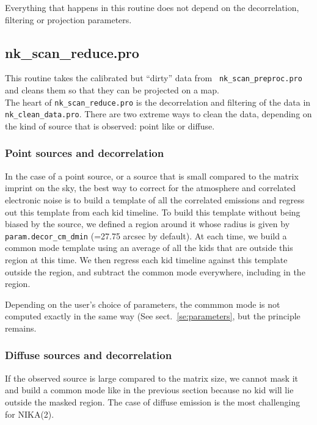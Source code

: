 \documentclass[a4paper,10pt]{article}
\begin{document}
Everything that happens in this routine does not depend on the decorrelation,
filtering or projection parameters.


\subsection{nk\_scan\_reduce.pro}

This routine takes the calibrated but ``dirty'' data from {\tt
  nk\_scan\_preproc.pro} and cleans them so that they can be projected on a
map.\\

The heart of {\tt nk\_scan\_reduce.pro} is the decorrelation and filtering of
the data in {\tt nk\_clean\_data.pro}. There are two extreme ways to clean the
data, depending on the kind of source  that is observed: point like or diffuse.

\subsubsection{Point sources and decorrelation}

In the case of a point source, or a source that is small compared to the matrix
imprint on the sky, the best way to correct for the atmosphere and correlated
electronic noise is to build a template of all the correlated emissions and
regress out this template from each kid timeline. To build this template without
being biased by the source, we defined a region around it whose radius is given
by {\tt param.decor\_cm\_dmin} (=27.75 arcsec by default). At each time, we
build a common mode template using an average of all the kids that are outside
this region at this time. We then regress each kid timeline against this
template outside the region, and subtract the common mode everywhere, including
in the region.

Depending on the user's choice of parameters, the commmon mode is not computed
exactly in the same way (See sect.~\ref{se:parameters}, but the principle remains.

\subsubsection{Diffuse sources and decorrelation}

If the observed source is large compared to the matrix size, we cannot mask it
and build a common mode like in the previous section because no kid will lie
outside the masked region. The case of diffuse emission is the most challenging
for NIKA(2).
\end{document}
